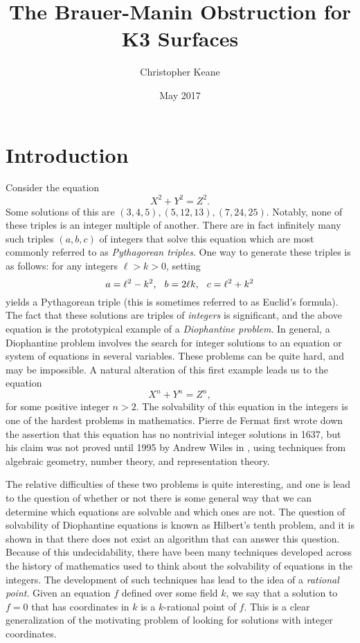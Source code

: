 \documentclass[12pt,twoside]{reedthesis}
\title{The Brauer-Manin Obstruction for K3 Surfaces}
\author{Christopher Keane}
\date{May 2017}
\theoremstyle{plain}
\theoremstyle{definition}
\theoremstyle{remark}
\begin{document}
\maketitle
\frontmatter 
\pagestyle{empty} 
\tableofcontents
\chapter*{Introduction}
Consider the equation
\[
X^2+Y^2=Z^2.
\]
Some solutions of this are $(3,4,5), (5,12,13), (7,24,25)$. Notably, none of these triples is an integer multiple of another. There are in fact infinitely many such triples $(a,b,c)$ of integers that solve this equation which are most commonly referred to as \emph{Pythagorean triples}. One way to generate these triples is as follows: for any integers $\ell>k>0$, setting
\[
a=\ell^2-k^2,\hspace{0.25cm} b=2\ell k,\hspace{0.25cm} c=\ell^2+k^2
\] 
yields a Pythagorean triple (this is sometimes referred to as Euclid's formula). The fact that these solutions are triples of \emph{integers} is significant, and the above equation is the prototypical example of a \emph{Diophantine problem}. In general, a Diophantine problem involves the search for integer solutions to an equation or system of equations in several variables. These problems can be quite hard, and may be impossible. A natural alteration of this first example leads us to the equation
\[
X^n+Y^n=Z^n,
\]
for some positive integer $n>2$. The solvability of this equation in the integers is one of the hardest problems in mathematics. Pierre de Fermat first wrote down the assertion that this equation has no nontrivial integer solutions in 1637, but his claim was not proved until 1995 by Andrew Wiles in \cite{FLT}, using techniques from algebraic geometry, number theory, and representation theory. 

The relative difficulties of these two problems is quite interesting, and one is lead to the question of whether or not there is some general way that we can determine which equations are solvable and which ones are not. The question of solvability of Diophantine equations is known as Hilbert's tenth problem, and it is shown in \cite{hilbert10} that there does not exist an algorithm that can answer this question. Because of this undecidability, there have been many techniques developed across the history of mathematics used to think about the solvability of equations in the integers. The development of such techniques has lead to the idea of a \emph{rational point}. Given an equation $f$ defined over some field $k$, we say that a solution to $f=0$ that has coordinates in $k$ is a $k$-rational point of $f$. This is a clear generalization of the motivating problem of looking for solutions with integer coordinates. 
\end{document}
